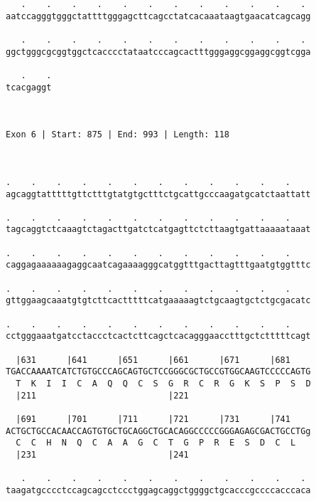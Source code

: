 \documentclass{article}
\begin{document}
\begin{Verbatim}
   .    .    .    .    .    .    .    .    .    .    .    . 
aatccagggtgggctattttgggagcttcagcctatcacaaataagtgaacatcagcagg
                                                            
   .    .    .    .    .    .    .    .    .    .    .    . 
ggctgggcgcggtggctcacccctataatcccagcactttgggaggcggaggcggtcgga
                                                            
   .    .
tcacgaggt
         
         
 
Exon 6 | Start: 875 | End: 993 | Length: 118



.    .    .    .    .    .    .    .    .    .    .    .    
agcaggtatttttgttctttgtatgtgctttctgcattgcccaagatgcatctaattatt
                                                            
.    .    .    .    .    .    .    .    .    .    .    .    
tagcaggtctcaaagtctagacttgatctcatgagttctcttaagtgattaaaaataaat
                                                            
.    .    .    .    .    .    .    .    .    .    .    .    
caggagaaaaaagaggcaatcagaaaagggcatggtttgacttagtttgaatgtggtttc
                                                            
.    .    .    .    .    .    .    .    .    .    .    .    
gttggaagcaaatgtgtcttcactttttcatgaaaaagtctgcaagtgctctgcgacatc
                                                            
.    .    .    .    .    .    .    .    .    .    .    .    
cctgggaaatgatcctaccctcactcttcagctcacagggaacctttgctctttttcagt
                                                            
  |631      |641      |651      |661      |671      |681    
TGACCAAAATCATCTGTGCCCAGCAGTGCTCCGGGCGCTGCCGTGGCAAGTCCCCCAGTG
  T  K  I  I  C  A  Q  Q  C  S  G  R  C  R  G  K  S  P  S  D
  |211                          |221                        
  
  |691      |701      |711      |721      |731      |741    
ACTGCTGCCACAACCAGTGTGCTGCAGGCTGCACAGGCCCCCGGGAGAGCGACTGCCTGg
  C  C  H  N  Q  C  A  A  G  C  T  G  P  R  E  S  D  C  L   
  |231                          |241                        
  
   .    .    .    .    .    .    .    .    .    .    .    . 
taagatgcccctccagcagcctccctggagcaggctggggctgcacccgccccacccaca
                                                            

\end{Verbatim}
\end{document}
